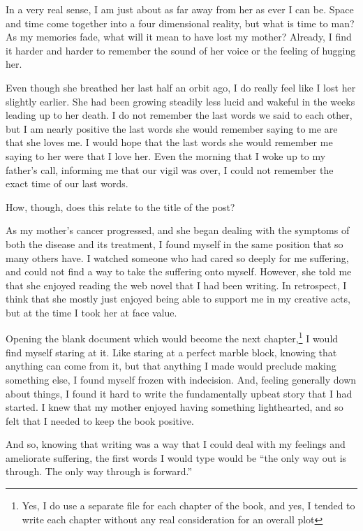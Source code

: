 \documentclass[12pt]{article}
\newcommand{\say}[1]{``#1''}
\renewcommand{\,}{\textsuperscript{,}}
\begin{document}
In a very real sense, I am just about as far away from her as ever I can be.  
Space and time come together into a four dimensional reality, but what is time to man?  
As my memories fade, what will it mean to have lost my mother?  
Already, I find it harder and harder to remember the sound of her voice or the feeling of hugging her.

Even though she breathed her last half an orbit ago, I do really feel like I lost her slightly earlier.  
She had been growing steadily less lucid and wakeful in the weeks leading up to her death.  
I do not remember the last words we said to each other, but I am nearly positive the last words she would remember saying to me are that she loves me.  
I would hope that the last words she would remember me saying to her were that I love her.  
Even the morning that I woke up to my father's call, informing me that our vigil was over, I could not remember the exact time of our last words.

How, though, does this relate to the title of the post?

As my mother's cancer progressed, and she began dealing with the symptoms of both the disease and its treatment, I found myself in the same position that so many others have.  
I watched someone who had cared so deeply for me suffering, and could not find a way to take the suffering onto myself.  
However, she told me that she enjoyed reading the web novel that I had been writing.  
In retrospect, I think that she mostly just enjoyed being able to support me in my creative acts, but at the time I took her at face value.

Opening the blank document which would become the next chapter,\footnote{Yes, I do use a separate file for each chapter of the book, and yes, I tended to write each chapter without any real consideration for an overall plot} I would find myself staring at it.  
Like staring at a perfect marble block, knowing that anything can come from it, but that anything I made would preclude making something else, I found myself frozen with indecision.  
And, feeling generally down about things, I found it hard to write the fundamentally upbeat story that I had started.  
I knew that my mother enjoyed having something lighthearted, and so felt that I needed to keep the book positive.

And so, knowing that writing was a way that I could deal with my feelings and ameliorate suffering, the first words I would type would be \say{the only way out is through. The only way through is forward.}
\end{document}
